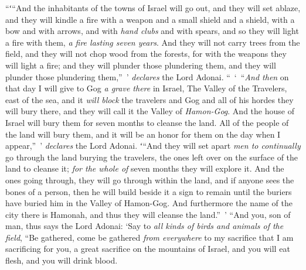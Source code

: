 \begin{biblechapter}
\verse “ʻ“And the inhabitants of the towns of Israel will go out, and they will set ablaze, and they will kindle a fire with a weapon and a small shield and a shield, with a bow and with arrows, and with \textit{hand clubs} and with spears, and so they will light a fire with them, \textit{a fire lasting seven years}.
\verse And they will not carry trees from the field, and they will not chop wood from the forests, for with the weapons they will light a fire; and they will plunder those plundering them, and they will plunder those plundering them,” ’ \textit{declares} the Lord Adonai.
\verse “ ‘ “\textit{And then} on that day I will give to Gog \textit{a grave there} in Israel, The Valley of the Travelers, east of the sea, and it \textit{will block} the travelers and Gog and all of his hordes they will bury there, and they will call it the Valley of \textit{Hamon-Gog}.
\verse And the house of Israel will bury them for seven months to cleanse the land.
\verse All of the people of the land will bury them, and it will be an honor for them on the day when I appear,” ’ \textit{declares} the Lord Adonai.
\verse ʻ“And they will set apart \textit{men to continually} go through the land burying the travelers, the ones left over on the surface of the land to cleanse it; \textit{for the whole of} seven months they will explore it.
\verse And the ones going through, they will go through within the land, and if anyone sees the bones of a person, then he will build beside it a sign to remain until the buriers have buried him in the Valley of Hamon-Gog.
\verse And furthermore the name of the city there is Hamonah, and thus they will cleanse the land.” ’
\verse “And you, son of man, thus says the Lord Adonai: ‘Say to \textit{all kinds of birds and animals of the field}, “Be gathered, come be gathered \textit{from everywhere} to my sacrifice that I am sacrificing for you, a great sacrifice on the mountains of Israel, and you will eat flesh, and you will drink blood.

\end{biblechapter}
